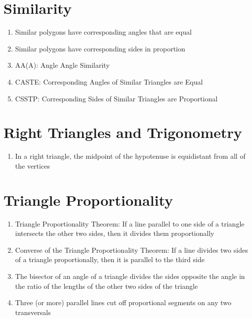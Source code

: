 \section*{Similarity}
\begin{enumerate}
    \item Similar polygons have corresponding angles that are equal
    \item Similar polygons have corresponding sides in proportion
    \item AA(A): Angle Angle Similarity
    \item CASTE: Corresponding Angles of Similar Triangles are Equal
    \item CSSTP: Corresponding Sides of Similar Triangles are Proportional
\end{enumerate}

\section*{Right Triangles and Trigonometry}
\begin{enumerate}
    \item In a right triangle, the midpoint of the hypotenuse is equidistant from all of the vertices
\end{enumerate}

\section*{Triangle Proportionality}
\begin{enumerate}
    \item Triangle Proportionality Theorem: If a line parallel to one side of a triangle intersects the other two sides, then it divides them proportionally
    \item Converse of the Triangle Proportionality Theorem: If a line divides two sides of a triangle proportionally, then it is parallel to the third side
    \item The bisector of an angle of a triangle divides the sides opposite the angle in the ratio of the lengths of the other two sides of the triangle
    \item Three (or more) parallel lines cut off proportional segments on any two transversals
\end{enumerate}

